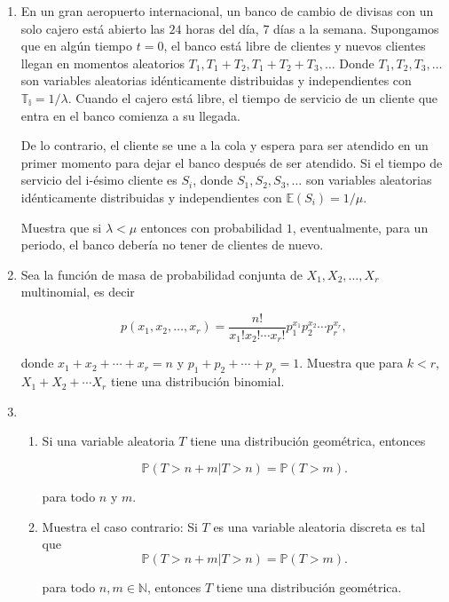 \documentclass[a4paper,11pt]{report}
\begin{document}
\begin{enumerate}
\item En un gran aeropuerto internacional, un banco de cambio de divisas con un solo cajero est\'a abierto las $24$ horas del d\'ia, 7 d\'ias a la semana. Supongamos que en alg\'un tiempo $t = 0$, el banco est\'a libre de  clientes y  nuevos clientes llegan en momentos aleatorios $T_1, T_1 + T_2, T_1 + T_2 + T_3, \dots $ Donde $T_1, T_2, T_3,\dots $ son variables aleatorias  id\'enticamente distribuidas y  independientes con $\mathbb{T_i} = 1 / \lambda$. Cuando el cajero est\'a libre, el tiempo de servicio de un cliente que entra en el banco comienza a su llegada.

De lo contrario, el cliente se une a la cola y espera para ser atendido en un primer momento para  dejar el banco despu\'es de ser atendido. Si el tiempo de servicio  del i-\'esimo cliente es  $S_i$, donde $S_1, S_2, S_3,\dots $ son variables aleatorias id\'enticamente distribuidas y  independientes con $\mathbb{E}(S_i) = 1/\mu $. 

Muestra que si $\lambda < \mu $  entonces con probabilidad $1$, eventualmente, para un  periodo,  el banco deber\'ia no tener  de clientes de nuevo.


\item Sea la funci\'on de masa de probabilidad conjunta de $X_1, X_2, \dots, X_r$ multinomial, es decir

\[
p(x_1, x_2, \dots, x_r) = \frac{n!}{x_1!x_2!\cdots x_r!}p_1^{x_1}p_{2}^{x_2}\cdots p_r^{x_r},
\]

donde $x_1  + x_2 + \cdots + x_r = n$ y $p_1 + p_2 + \cdots + p_r = 1$. Muestra que para $k < r$, $X_1 + X_2 + \cdots X_r$ tiene una distribuci\'on binomial.


\item

\begin{enumerate}
	\item Si una variable aleatoria $T$ tiene una distribuci\'on geom\'etrica, entonces
	
	\[
	\mathbb{P}(T > n + m | T >n) = \mathbb{P}(T > m).
	\]
	
	para todo $n$ y $m$.
	
	\item Muestra el caso contrario: Si $T$ es una variable aleatoria discreta es tal que
	\[
	\mathbb{P}(T > n + m | T >n) = \mathbb{P}(T > m).
	\]
	
	para todo $n, m \in \mathbb{N}$, entonces $T$ tiene una distribuci\'on geom\'etrica.	
	

\end{enumerate}
\end{enumerate}
\end{document}
